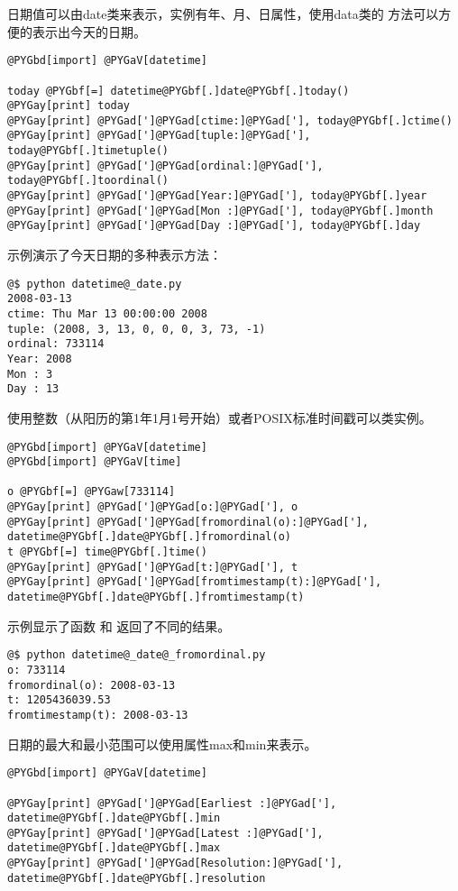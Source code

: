 \documentclass[letterpaper,10pt,english]{manual}
\begin{document}
日期值可以由date类来表示，实例有年、月、日属性，使用data类的  方法可以方便的表示出今天的日期。

\begin{Verbatim}[commandchars=@\[\]]
@PYGbd[import] @PYGaV[datetime]

today @PYGbf[=] datetime@PYGbf[.]date@PYGbf[.]today()
@PYGay[print] today
@PYGay[print] @PYGad[']@PYGad[ctime:]@PYGad['], today@PYGbf[.]ctime()
@PYGay[print] @PYGad[']@PYGad[tuple:]@PYGad['], today@PYGbf[.]timetuple()
@PYGay[print] @PYGad[']@PYGad[ordinal:]@PYGad['], today@PYGbf[.]toordinal()
@PYGay[print] @PYGad[']@PYGad[Year:]@PYGad['], today@PYGbf[.]year
@PYGay[print] @PYGad[']@PYGad[Mon :]@PYGad['], today@PYGbf[.]month
@PYGay[print] @PYGad[']@PYGad[Day :]@PYGad['], today@PYGbf[.]day
\end{Verbatim}

示例演示了今天日期的多种表示方法：

\begin{Verbatim}[commandchars=@\[\]]
@$ python datetime@_date.py
2008-03-13
ctime: Thu Mar 13 00:00:00 2008
tuple: (2008, 3, 13, 0, 0, 0, 3, 73, -1)
ordinal: 733114
Year: 2008
Mon : 3
Day : 13
\end{Verbatim}

使用整数（从阳历的第1年1月1号开始）或者POSIX标准时间戳可以类实例。

\begin{Verbatim}[commandchars=@\[\]]
@PYGbd[import] @PYGaV[datetime]
@PYGbd[import] @PYGaV[time]

o @PYGbf[=] @PYGaw[733114]
@PYGay[print] @PYGad[']@PYGad[o:]@PYGad['], o
@PYGay[print] @PYGad[']@PYGad[fromordinal(o):]@PYGad['], datetime@PYGbf[.]date@PYGbf[.]fromordinal(o)
t @PYGbf[=] time@PYGbf[.]time()
@PYGay[print] @PYGad[']@PYGad[t:]@PYGad['], t
@PYGay[print] @PYGad[']@PYGad[fromtimestamp(t):]@PYGad['], datetime@PYGbf[.]date@PYGbf[.]fromtimestamp(t)
\end{Verbatim}

示例显示了函数  和  返回了不同的结果。

\begin{Verbatim}[commandchars=@\[\]]
@$ python datetime@_date@_fromordinal.py
o: 733114
fromordinal(o): 2008-03-13
t: 1205436039.53
fromtimestamp(t): 2008-03-13
\end{Verbatim}

日期的最大和最小范围可以使用属性max和min来表示。

\begin{Verbatim}[commandchars=@\[\]]
@PYGbd[import] @PYGaV[datetime]

@PYGay[print] @PYGad[']@PYGad[Earliest :]@PYGad['], datetime@PYGbf[.]date@PYGbf[.]min
@PYGay[print] @PYGad[']@PYGad[Latest :]@PYGad['], datetime@PYGbf[.]date@PYGbf[.]max
@PYGay[print] @PYGad[']@PYGad[Resolution:]@PYGad['], datetime@PYGbf[.]date@PYGbf[.]resolution
\end{Verbatim}
\end{document}
